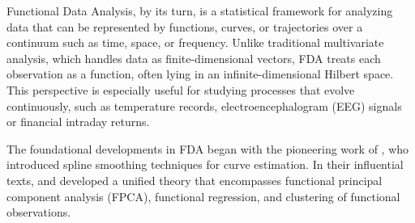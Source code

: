 \documentclass[
	12pt,				%
	oneside,			%
	a4paper,			%
	english,			%
	brazil				%
	]{abntex2ppgsi}
\begin{document}



Functional Data Analysis, by its turn, is a statistical framework for analyzing data that can be represented by functions, curves, or trajectories over a continuum such as time, space, or frequency. Unlike traditional multivariate analysis, which handles data as finite-dimensional vectors, FDA treats each observation as a function, often lying in an infinite-dimensional Hilbert space. This perspective is especially useful for studying processes that evolve continuously, such as temperature records, electroencephalogram (EEG) signals or financial intraday returns.


The foundational developments in FDA began with the pioneering work of , who introduced spline smoothing techniques for curve estimation. In their influential texts,  and  developed a unified theory that encompasses functional principal component analysis (FPCA), functional regression, and clustering of functional observations.
\end{document}
